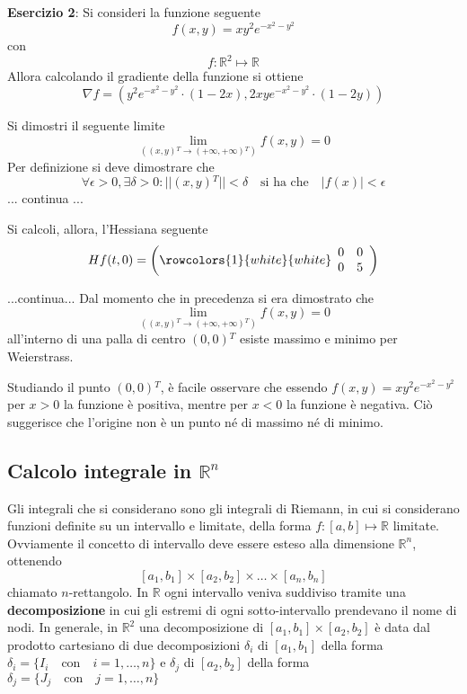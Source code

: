 \documentclass[a4paper]{extarticle}
\begin{document}
\vspace{1em}
\noindent
\textbf{Esercizio 2}: Si consideri la funzione seguente
\[f(x,y) = x y^2 e^{-x^2 - y^2}\]
con
\[f : \mathbb{R}^2 \longmapsto \mathbb{R}\]
Allora calcolando il gradiente della funzione si ottiene
\[\nabla f = \left(y^2 e^{-x^2-y^2} \cdot (1-2x), 2xy e^{-x^2-y^2} \cdot (1-2y)\right)\]

\vspace{1em}
\noindent
Si dimostri il seguente limite
\[\lim_{((x,y){^T} \to (+\infty,+\infty){^T})} f(x,y) = 0\]
Per definizione si deve dimostrare che
\[\forall \epsilon > 0, \exists \delta > 0 : \vert \vert (x,y){^T} \vert \vert < \delta \hspace{1em} \text{si ha che} \hspace{1em} \vert f(x) \vert < \epsilon\]
... continua ...

\vspace{1em}
\noindent
Si calcoli, allora, l'Hessiana seguente
\[H f(t,0) = \left(
    \rowcolors{1}{white}{white}
    \begin{array}{cc}
        0 & 0\\
        0 & 5
    \end{array}
\right)\]

\vspace{1em}
\noindent
...continua... Dal momento che in precedenza si era dimostrato che
\[\lim_{((x,y){^T} \to (+\infty,+\infty){^T})} f(x,y) = 0\]
all'interno di una palla di centro $(0,0){^T}$ esiste massimo e minimo per Weierstrass.

\vspace{1em}
\noindent
Studiando il punto $(0,0){^T}$, è facile osservare che essendo $f(x,y)=xy^2 e^{-x^2-y^2}$ per $x>0$ la funzione è positiva, mentre per $x<0$ la funzione è negativa. Ciò suggerisce che l'origine non è un punto né di massimo né di minimo.

\vspace{1em}
\subsection{Calcolo integrale in $\mathbb{R}^n$}
Gli integrali che si considerano sono gli integrali di Riemann, in cui si considerano funzioni definite su un intervallo e limitate, della forma $f : [a,b] \longmapsto \mathbb{R}$ limitate.\\
Ovviamente il concetto di intervallo deve essere esteso alla dimensione $\mathbb{R}^n$, ottenendo
\[[a_1,b_1] \times [a_2,b_2] \times \dots \times [a_n,b_n]\]
chiamato $n$-rettangolo. In $\mathbb{R}$ ogni intervallo veniva suddiviso tramite una \textbf{decomposizione} in cui gli estremi di ogni sotto-intervallo prendevano il nome di nodi. In generale, in $\mathbb{R}^2$ una decomposizione di $[a_1,b_1] \times [a_2,b_2]$ è data dal prodotto cartesiano di due decomposizioni $\delta_i$ di $[a_1,b_1]$ della forma $\delta_i = \{I_i \hspace{1em} \text{con} \hspace{1em} i=1,\dots,n\}$ e $\delta_j$ di $[a_2,b_2]$ della forma $\delta_j = \{J_j \hspace{1em} \text{con} \hspace{1em} j=1,\dots,n\}$ 
\end{document}
